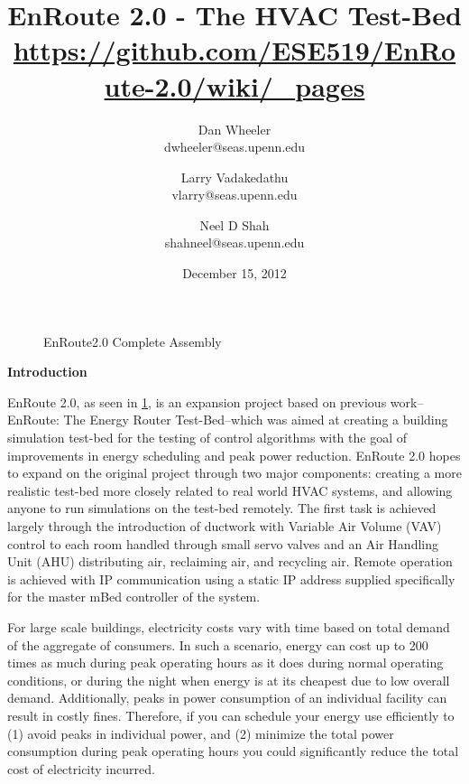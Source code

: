 \documentclass[a4paper,10pt,twocolumn]{article}
\begin{document}
\title{{\bf EnRoute 2.0 - The HVAC Test-Bed} \\ \normalsize\url{https://github.com/ESE519/EnRoute-2.0/wiki/_pages}}
\date{December 15, 2012}
\author{Dan Wheeler \\dwheeler@seas.upenn.edu
        \and Larry Vadakedathu \\vlarry@seas.upenn.edu
	\and Neel D Shah \\shahneel@seas.upenn.edu}
\maketitle

\begin{figure}[ht]
\centering
{}
\caption{EnRoute2.0 Complete Assembly}
\label{enroute2}
\end{figure}

\vspace{-5 mm}

\begin{center}
{\bf Introduction}
\end{center}

EnRoute 2.0, as seen in \ref{enroute2}, is an expansion project based on previous work--EnRoute:  The Energy Router Test-Bed--which was aimed at creating a building simulation test-bed for the testing of control algorithms with the goal of improvements in energy scheduling and peak power reduction.  EnRoute 2.0 hopes to expand on the original project through two major components:  creating a more realistic test-bed more closely related to real world HVAC systems, and allowing anyone to run simulations on the test-bed remotely.  The first task is achieved largely through the introduction of ductwork with Variable Air Volume (VAV) control to each room handled through small servo valves and an Air Handling Unit (AHU) distributing air, reclaiming air, and recycling air.  Remote operation is achieved with IP communication using a static IP address supplied specifically for the master mBed controller of the system.

For large scale buildings, electricity costs vary with time based on total demand of the aggregate of consumers.  In such a scenario, energy can cost up to 200 times as much during peak operating hours as it does during normal operating conditions, or during the night when energy is at its cheapest due to low overall demand.  Additionally, peaks in power consumption of an individual facility can result in costly fines.  Therefore, if you can schedule your energy use efficiently to (1) avoid peaks in individual power, and (2) minimize the total power consumption during peak operating hours you could significantly reduce the total cost of electricity incurred.
\end{document}

